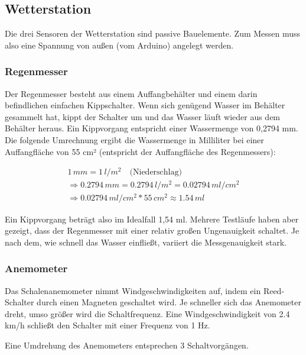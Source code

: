 \documentclass[12pt]{article}
\begin{document}
    \subsection{Wetterstation} \label{sensors}
    Die drei Sensoren der Wetterstation sind passive Bauelemente.
    Zum Messen muss also eine Spannung von außen (vom Arduino) angelegt werden.


    
      \subsubsection{Regenmesser}
        Der Regenmesser besteht aus einem Auffangbehälter und einem darin befindlichen einfachen Kippschalter.
        Wenn sich genügend Wasser im Behälter gesammelt hat, kippt der Schalter um und das Wasser läuft wieder aus dem Behälter heraus.
        Ein Kippvorgang entspricht einer Wassermenge von 0,2794 mm.
        Die folgende Umrechnung ergibt die Wassermenge in Milliliter bei einer Auffangfläche von 55 cm² (entspricht der Auffangfläche des Regenmessers):

        \begin{multline}
          1\,mm = 1\,l/m^2 \quad \text{(Niederschlag)} \\
          \Rightarrow 0.2794\,mm = 0.2794\,l/m^2 = 0.02794\,ml/cm^2 \\
          \Rightarrow 0.02794\,ml/cm^2 * 55\,cm^2 \approx 1.54\,ml
        \end{multline}

        Ein Kippvorgang beträgt also im Idealfall 1,54 ml.
        Mehrere Testläufe haben aber gezeigt, dass der Regenmesser mit einer relativ großen Ungenauigkeit schaltet.
        Je nach dem, wie schnell das Wasser einfließt, variiert die Messgenauigkeit stark.



      \subsubsection{Anemometer}
        Das Schalenanemometer nimmt Windgeschwindigkeiten auf, indem ein Reed-Schalter durch einen Magneten geschaltet wird.
        Je schneller sich das Anemometer dreht, umso größer wird die Schaltfrequenz.
        Eine Windgeschwindigkeit von 2.4 km/h schließt den Schalter mit einer Frequenz von 1 Hz.

        Eine Umdrehung des Anemometers entsprechen 3 Schaltvorgängen.
\end{document}
